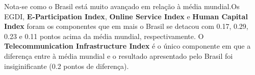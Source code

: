 Nota-se como o Brasil está muito avançado em relação à média mundial.Os EGDI, \textbf{E-Participation Index}, \textbf{Online Service Index} e \textbf{Human Capital Index} foram os componentes que em mais o Brasil se detacou com 0.17, 0.29, 0.23 e 0.11 pontos acima da média mundial, respectivamente. O \textbf{Telecommunication Infrastructure Index} é o único componente em que a diferença entre à média mundial e o resultado apresentado pelo Brasil foi insiginificante (0.2 pontos de diferença).

